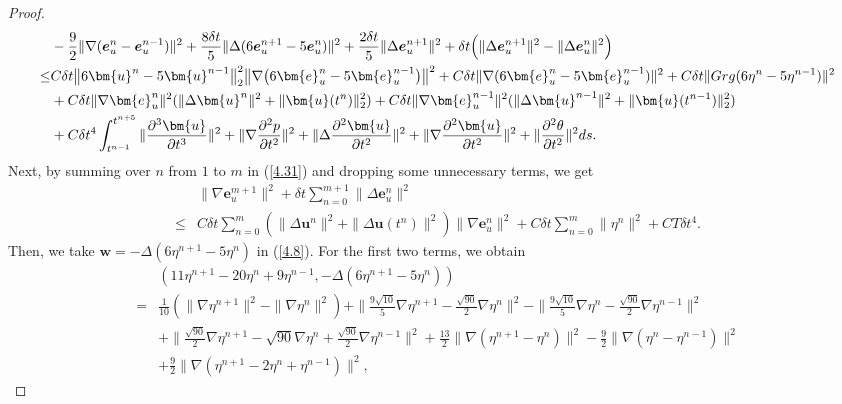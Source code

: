 \documentclass[10pt]{article}
\begin{document}
\begin{proof}
\begin{align}
			&- \frac{9}{2} \|\nabla (\boldsymbol{e}_u^{n} - \boldsymbol{e}_u^{n-1})\|^2 
			+ \frac{8\delta t}{5} \|\Delta (6\boldsymbol{e}_u^{n+1} - 5\boldsymbol{e}_u^n)\|^2 
			+ \frac{2\delta t}{5} \|\Delta \boldsymbol{e}_u^{n+1}\|^2+ \delta t \Bigl( \|\Delta \boldsymbol{e}_u^{n+1}\|^2 - \|\Delta \boldsymbol{e}_u^n\|^2 \Bigr)\nonumber\\
			\leq &C \delta t\bigl\|6\bm{u}^n - 5\bm{u}^{n-1}\bigr\|_2^2
			{ \bigl\|\nabla\bigl(6\bm{e}_u^{n} - 5 \bm{e}_u^{n-1}\bigr)\bigr\|^2 +C\delta t\|\nabla(6\bm{e}_u^{n}-5\bm{e}_u^{n-1})\|^2}+C\delta t\|Grg(6\eta^n-5\eta^{n-1})\|^2\nonumber\\
			&+C\delta t \|\nabla\bm{e}_u^n\|^2(\|\Delta\bm{u}^n\|^2+\|\bm{u}(t^n)\|_2^2)+C\delta t{ \|\nabla\bm{e}_u^{n-1}\|^2}(\|\Delta\bm{u}^{n-1}\|^2+\|\bm{u}(t^{n-1})\|_2^2) \nonumber\\
			&+C\delta t^4\int^{t^{n+5}}_{t^{n-1}}\|\frac{\partial^3\bm{u}}{\partial t^3}\|^2+\|\nabla\frac{\partial^2 p}{\partial t^2}\|^2+\|\Delta\frac{\partial^2\bm{u}}{\partial t^2}\|^2+\|\nabla\frac{\partial^2\bm{u}}{\partial t^2}\|^2+\|\frac{\partial^2\theta}{\partial t^2}\|^2 ds. \label{4.31}
		\end{align}
		Next, by summing over \( n \) from \( 1 \) to \( m \) in (\ref{4.31}) and dropping some unnecessary terms, we get
		\begin{align}
			&\|\nabla\bm{e}_u^{m+1}\|^2+\delta t\sum_{n=0}^{m+1}\|\Delta\bm{e}_u^n\|^2\nonumber\\
			\leq& C\delta t\sum_{n=0}^{m}(\|\Delta\bm{u}^n\|^2+\|\Delta\bm{u}(t^n)\|^2)\|{ \nabla\bm{e}_u^n\|^2}+C\delta t\sum_{n=0}^{m}\|\eta^n\|^2+CT\delta t^4. \label{4.32}
		\end{align}
		Then, we take \( \bm{w} = -\Delta(6\eta^{n+1} - 5\eta^n) \) in (\ref{4.8}). For the first two terms, we obtain
		\begin{align} \label{4.33}
			&(11\eta^{n+1} - 20\eta^n + 9\eta^{n-1}, 
			-\Delta(6\eta^{n+1} - 5\eta^n))\\
			=& \frac{1}{10} (\|\nabla \eta^{n+1}\|^2-\|\nabla \eta^{n}\|^2 )
			+ \|\frac{9\sqrt{10}}{5} \nabla \eta^{n+1}-\frac{\sqrt{90}}{2} \nabla \eta^n\|^2 - \|\frac{9\sqrt{10}}{5} \nabla \eta^{n}-\frac{\sqrt{90}}{2} \nabla \eta^{n-1}\|^2  \nonumber\\
			&+\|\frac{\sqrt{90}}{2} \nabla \eta^{n+1}-\sqrt{90} \nabla \eta^n+\frac{\sqrt{90}}{2} \nabla \eta^{n-1}\|^2+\frac{13}{2}\|\nabla(\eta^{n+1}-\eta^n)\|^2- \frac{9}{2} \|\nabla (\eta^n - \eta^{n-1})\|^2 \nonumber\\
			&
			+ \frac{9}{2} \|\nabla (\eta^{n+1} - 2\eta^n + \eta^{n-1})\|^2 ,

\end{align}
\end{proof}
\end{document}
